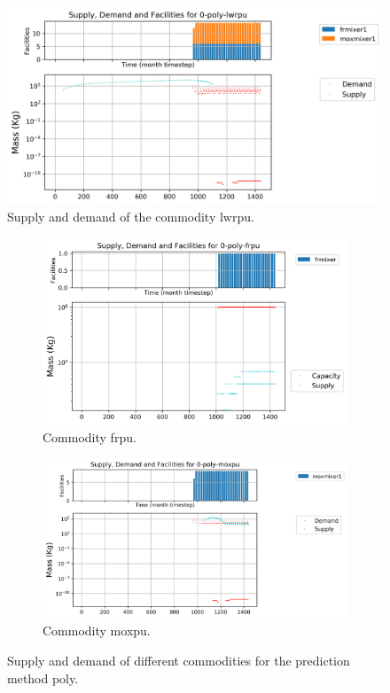 \documentclass[11pt]{article}
\begin{document}
\begin{figure}[H]
	\centering
	\includegraphics[width=\textwidth]{29-figures/0-poly-lwrpu.png} 
	\hfill
	\caption{Supply and demand of the commodity lwrpu.}
	\label{fig:29-pu1}
\end{figure}

\begin{figure}[H]
	\centering
	\begin{subfigure}[t]{0.45\textwidth}
		\centering
		\includegraphics[width=\linewidth]{23-figures/0-poly-frpu.png} 
		\caption{Commodity frpu.}
		\label{fig:29-frpu}
	\end{subfigure}
	\vspace{1cm}
	\begin{subfigure}[t]{0.45\textwidth}
		\centering
		\includegraphics[width=\linewidth]{29-figures/0-poly-moxpu.png} 
		\caption{Commodity moxpu.}
		\label{fig:29-moxpu}
	\end{subfigure}
	\hfill
	\caption{Supply and demand of different commodities for the prediction method poly.}
	\label{fig:29-pu2}
\end{figure}
\end{document}
